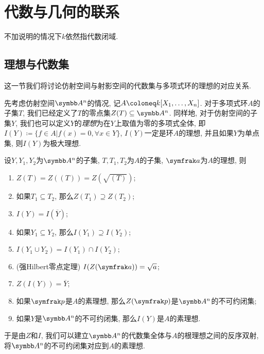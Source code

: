 
\section{代数与几何的联系}\label{sec:algebraandgeometry}

不加说明的情况下$k$依然指代数闭域.

\subsection{理想与代数集}

这一节我们将讨论仿射空间与射影空间的代数集与多项式环的理想的对应关系.

先考虑仿射空间$\AF^n$的情况, 记$A\coloneq \kk [X_1, \dotsc, X_n]$. 对于多项式环$A$的子集$T$, 我们已经定义了$T$的零点集$Z(T)\subseteq\AF^n$. 同样地, 对于仿射空间的子集$Y$, 我们也可以定义$Y$的\emph{理想}为在$Y$上取值为零的多项式全体, 即$I(Y)\coloneq \{f\in A\vert f(x)=0, \forall x\in Y\}$, $I(Y)$一定是环$A$的理想, 并且如果$Y$为单点集, 则$I(Y)$为极大理想.

\begin{proposition}\label{prop:affinegaloisconnectionclosedradical}
  设$Y, Y_1, Y_2$为$\AF^n$的子集, $T, T_1, T_2$为$A$的子集, $\ideal{a}$为$A$的理想, 则
  \begin{enumerate}
    \item\label{enum:prop-affine-galois-connection-closed-radical-1} $Z(T)=Z((T))=Z(\sqrt{(T)})$;
    \item\label{enum:prop-affine-galois-connection-closed-radical-2} 如果$T_1\subseteq T_2$, 那么$Z(T_1)\supseteq Z(T_2)$;
    \item\label{enum:prop-affine-galois-connection-closed-radical-3} $I(Y)=I(\overline{Y})$;
    \item\label{enum:prop-affine-galois-connection-closed-radical-4} 如果$Y_1\subseteq Y_2$, 那么$I(Y_1)\supseteq I(Y_2)$;
    \item\label{enum:prop-affine-galois-connection-closed-radical-5} $I(Y_1\cup Y_2)=I(Y_1)\cap I(Y_2)$;
    \item\label{enum:prop-affine-galois-connection-closed-radical-nullstellensatz} (强Hilbert零点定理\parencite[85, Exercise 14]{atiyah_introduction_1969}) $I(Z(\ideal{a}))=\sqrt{a}$;
    \item\label{enum:prop-affine-galois-connection-closed-radical-closure} $Z(I(Y))=\overline{Y}$;
    \item\label{enum:prop-affine-galois-connection-closed-radical-8} 如果$\ideal{p}$是$A$的素理想, 那么$Z(\ideal{p})$是$\AF^n$的不可约闭集;
    \item\label{enum:prop-affine-galois-connection-closed-radical-9} 如果$Y$是$\AF^n$的不可约闭集, 那么$I(Y)$是$A$的素理想.
  \end{enumerate}
  于是由$Z$和$I$, 我们可以建立$\AF^n$的代数集全体与$A$的根理想之间的反序双射, 将$\AF^n$的不可约闭集对应到$A$的素理想.
\end{proposition}

